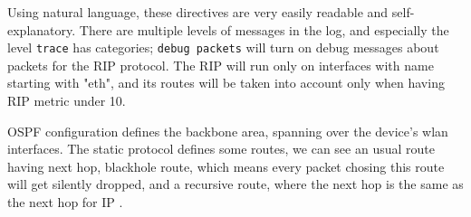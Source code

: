 


Using natural language, these directives are very easily readable and
self-explanatory. There are multiple levels of messages in the log, and
especially the level \texttt{trace} has categories; \texttt{debug packets}
will turn on debug messages about packets for the RIP protocol. The RIP will
run only on interfaces with name starting with "eth", and its routes will be
taken into account only when having RIP metric under 10.

OSPF configuration defines the backbone area, spanning over the device's wlan
interfaces. The static protocol defines some routes, we can see an usual route
having next hop, blackhole route, which means every packet chosing this route
will get silently dropped, and a recursive route, where the next hop is the
same as the next hop for IP .



